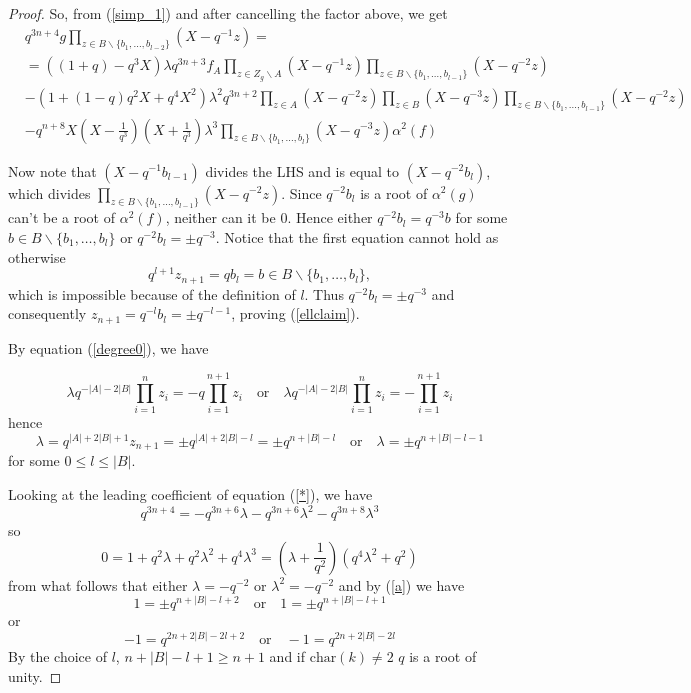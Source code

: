 \documentclass[a4paper, 11pt]{article}
\theoremstyle{definition}
\begin{document}
\begin{proof}
So, from (\ref{simp_1}) and after cancelling the factor above, we get
\begin{equation}\label{simp_1*}
\begin{split}
&q^{3n+4}g \prod_{z\in B\backslash \{b_1,\ldots,b_{l-2}\}}(X-q^{-1}z)=\\
&=\left((1+q)-q^3X\right)\lambda q^{3n+3}f_A\prod_{z\in Z_g\backslash A}(X-q^{-1}z)\prod_{z\in B\backslash \{b_1,\ldots,b_{l-1}\}}(X-q^{-2}z)\\
&-\left(1+(1-q)q^2X+q^4X^2\right)\lambda^2q^{3n+2}\prod_{z\in A}(X-q^{-2}z)\prod_{z\in B}(X-q^{-3}z)\prod_{z\in B\backslash \{b_1,\ldots,b_{l-1}\}}(X-q^{-2}z)\\
&-q^{n+8}X(X-\frac{1}{q^3})(X+\frac{1}{q^3})\lambda^3\prod_{z\in B\backslash\{b_1,\ldots,b_l\}}(X-q^{-3}z)\alpha^2(f)
\end{split}
\end{equation}

Now note that $(X-q^{-1}b_{l-1})$ divides the LHS and is equal to $(X-q^{-2}b_l)$, which divides $\prod_{z\in B\backslash \{b_1,\ldots,b_{l-1}\}}(X-q^{-2}z)$. Since $q^{-2}b_l$ is a root of $\alpha^2(g)$ can't be a root of $\alpha^2(f)$, neither can it be $0$. Hence either $q^{-2}b_l=q^{-3}b$ for some $b\in B\backslash\{b_1,\ldots,b_l\}$ or $q^{-2}b_l=\pm q^{-3}$. Notice that the first equation cannot hold as otherwise 
$$q^{l+1}z_{n+1}=qb_l=b\in B\backslash\{b_1,\ldots,b_l\},$$ 
which is impossible because of the definition of $l$. Thus $q^{-2}b_l=\pm q^{-3}$  and consequently $z_{n+1}=q^{-l}b_l=\pm q^{-l-1}$, proving (\ref{ellclaim}).



By equation (\ref{degree0}), we have

\begin{equation}
\lambda q^{-|A|-2|B|}\prod_{i=1}^nz_i=-q\prod_{i=1}^{n+1}z_i\quad \mbox{or}\quad \lambda q^{-|A|-2|B|}\prod_{i=1}^nz_i=-\prod_{i=1}^{n+1}z_i
\end{equation}
hence
\begin{equation}\label{a}
\lambda =q^{|A|+2|B|+1}z_{n+1}=\pm q^{|A|+2|B|-l}=\pm q^{n+|B|-l}\quad \mbox{or}\quad \lambda=\pm q^{n+|B|-l-1}
\end{equation}
for some $0\leq l\leq |B|$.

Looking at the leading coefficient of equation (\ref{*}), we have
$$q^{3n+4}=-q^{3n+6}\lambda-q^{3n+6}\lambda^2-q^{3n+8}\lambda^3$$
so $$0=1+q^2\lambda+q^2\lambda^2+q^4\lambda^3=(\lambda+\frac{1}{q^2})(q^4\lambda^2+q^2)$$
from what follows that either $\lambda=-q^{-2}$ or $\lambda^2=-q^{-2}$
and by (\ref{a}) we have
\begin{equation}
1=\pm q^{n+|B|-l+2}\quad \mbox{or}\quad 1=\pm q^{n+|B|-l+1}
\end{equation}
or
\begin{equation}\label{final}
-1=q^{2n+2|B|-2l+2}\quad \mbox{or}\quad -1=q^{2n+2|B|-2l}
\end{equation}
By the choice of $l$, $n+|B|-l+1\geq n+1$ and if $\mathrm{char}(k)\neq 2$ $q$ is a root of unity.


\end{proof}
\end{document}
